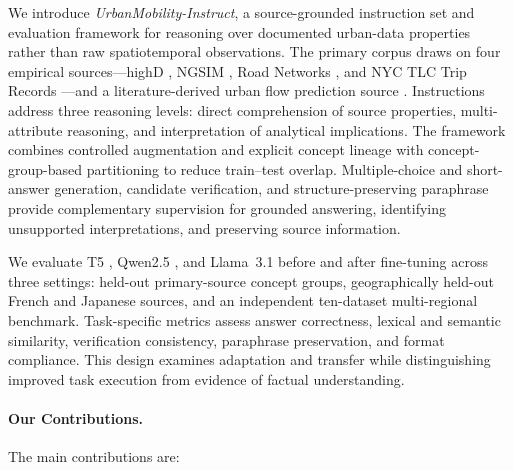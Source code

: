 \documentclass[a4paper,fleqn]{cas-sc}
\begin{document}
We introduce \textit{UrbanMobility-Instruct}, a source-grounded instruction set and evaluation framework for reasoning over documented urban-data properties rather than raw spatiotemporal observations. The primary corpus draws on four empirical sources---highD \cite{highd2024dataset}, NGSIM \cite{ngsim2024dataset}, Road Networks \cite{networkrepository2024road}, and NYC TLC Trip Records \cite{nyc2024tlc}---and a literature-derived urban flow prediction source \cite{xie2020urbanflow}. Instructions address three reasoning levels: direct comprehension of source properties, multi-attribute reasoning, and interpretation of analytical implications. The framework combines controlled augmentation and explicit concept lineage with concept-group-based partitioning to reduce train--test overlap. Multiple-choice and short-answer generation, candidate verification, and structure-preserving paraphrase provide complementary supervision for grounded answering, identifying unsupported interpretations, and preserving source information.

We evaluate T5 \cite{raffel2020exploring}, Qwen2.5 \cite{yang2024qwen25}, and Llama~3.1 \cite{grattafiori2024llama} before and after fine-tuning across three settings: held-out primary-source concept groups, geographically held-out French and Japanese sources, and an independent ten-dataset multi-regional benchmark. Task-specific metrics assess answer correctness, lexical and semantic similarity, verification consistency, paraphrase preservation, and format compliance. This design examines adaptation and transfer while distinguishing improved task execution from evidence of factual understanding.

\paragraph{Our Contributions.}
The main contributions are:
\end{document}
